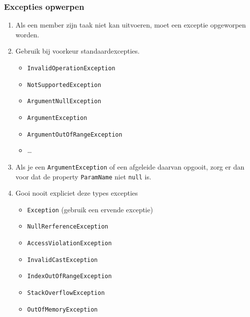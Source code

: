 \documentclass[a4paper,11pt]{article}
\begin{document}
\subsubsection{Excepties opwerpen}
\begin{enumerate}[resume]
\item Als een member zijn taak niet kan uitvoeren, moet een exceptie
opgeworpen worden.
\item Gebruik bij voorkeur standaardexcepties.
\begin{itemize}
\item \lstinline !InvalidOperationException!
\item \lstinline !NotSupportedException!
\item \lstinline !ArgumentNullException!
\item \lstinline !ArgumentException!
\item \lstinline !ArgumentOutOfRangeException!
\item \ldots
\end{itemize}
\item Als je een \lstinline !ArgumentException! of een afgeleide daarvan
opgooit, zorg er dan voor dat de property \lstinline !ParamName! niet
\lstinline !null! is.
\item Gooi nooit expliciet deze types excepties
\begin{itemize}
\item \lstinline !Exception! (gebruik een ervende exceptie)
\item \lstinline !NullRerferenceException!
\item \lstinline !AccessViolationException!
\item \lstinline !InvalidCastException!
\item \lstinline !IndexOutOfRangeException!
\item \lstinline !StackOverflowException!
\item \lstinline !OutOfMemoryException!
\end{itemize}
\end{enumerate}
\end{document}
